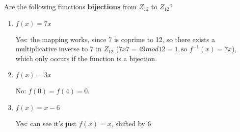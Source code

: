 \question Are the following functions \textbf{bijections} from 
$Z_{12}$ to $Z_{12}$?
\begin{enumerate}[label=\alph*.]
\item $f(x) = 7x$
\begin{solution}[0.3 in]
Yes: the mapping works, since 7 is coprime to 12, so there exists a 
multiplicative inverse to 7 in $Z_{12}$ ($7 x 7 = 49 mod 12 = 1, 
\text{so } f^{-1}(x) = 7x$), which only occurs if the function is a bijection.
\end{solution}
\item $f(x) = 3x$
\begin{solution}[0.3 in]
 No: $f(0) = f(4) = 0. $
\end{solution}
\item $f(x) = x - 6$
\begin{solution}[0.3 in]
Yes: can see it’s just $f(x) = x$, shifted by 6
\end{solution}
\end{enumerate}